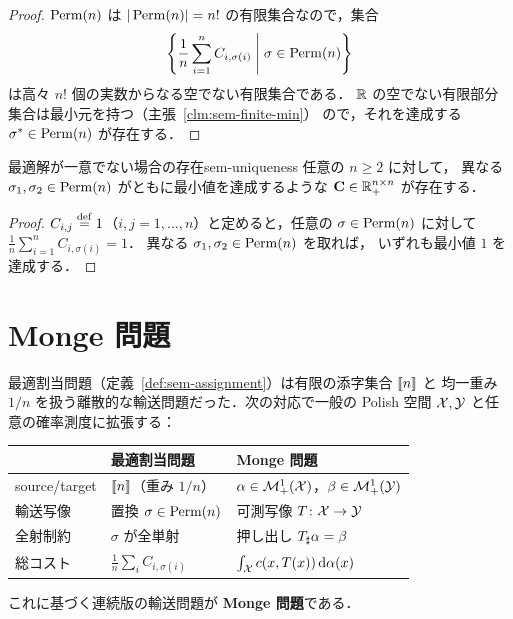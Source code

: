 \begin{proof}
  $\operatorname{Perm}(n)$ は $|\operatorname{Perm}(n)| = n!$ の有限集合なので，集合
  \[
    \left\{ \frac{1}{n}\sum_{i=1}^{n} C_{i, \sigma(i)} \;\middle|\; \sigma \in \operatorname{Perm}(n) \right\}
  \]
  は高々 $n!$ 個の実数からなる空でない有限集合である．
  $\mathbb{R}$ の空でない有限部分集合は最小元を持つ（主張~\ref{clm:sem-finite-min}）
  ので，それを達成する $\sigma^* \in \operatorname{Perm}(n)$ が存在する．
\end{proof}

\begin{claim}{最適解が一意でない場合の存在}{sem-uniqueness}
  任意の $n \geq 2$ に対して，
  異なる $\sigma_1, \sigma_2 \in \operatorname{Perm}(n)$ がともに最小値を達成するような
  $\mathbf{C} \in \mathbb{R}_+^{n \times n}$ が存在する．
\end{claim}

\begin{proof}
  $C_{i,j} \overset{\mathrm{def}}{=} 1$（$i, j = 1, \ldots, n$）と定めると，任意の $\sigma \in \operatorname{Perm}(n)$ に対して
  $\frac{1}{n}\sum_{i=1}^{n} C_{i, \sigma(i)} = 1$．
  異なる $\sigma_1, \sigma_2 \in \operatorname{Perm}(n)$ を取れば，
  いずれも最小値 $1$ を達成する．
\end{proof}

\section{Monge 問題}
\label{sec:sem-monge}

最適割当問題（定義~\ref{def:sem-assignment}）は有限の添字集合 $\llbracket n \rrbracket$ と
均一重み $1/n$ を扱う離散的な輸送問題だった．次の対応で一般の Polish 空間
$\mathcal{X}, \mathcal{Y}$ と任意の確率測度に拡張する：
\begin{center}
  \begin{tabular}{l|ll}
    & 最適割当問題 & Monge 問題 \\ \hline
    source/target & $\llbracket n \rrbracket$（重み $1/n$） & $\alpha \in \mathcal{M}_+^1(\mathcal{X})$，$\beta \in \mathcal{M}_+^1(\mathcal{Y})$ \\
    輸送写像 & 置換 $\sigma \in \operatorname{Perm}(n)$ & 可測写像 $T \colon \mathcal{X} \to \mathcal{Y}$ \\
    全射制約 & $\sigma$ が全単射 & 押し出し $T_\sharp \alpha = \beta$ \\
    総コスト & $\frac{1}{n}\sum_i C_{i, \sigma(i)}$ & $\int_{\mathcal{X}} c(x, T(x))\, \mathrm{d}\alpha(x)$
  \end{tabular}
\end{center}
これに基づく連続版の輸送問題が \textbf{Monge 問題}である．

